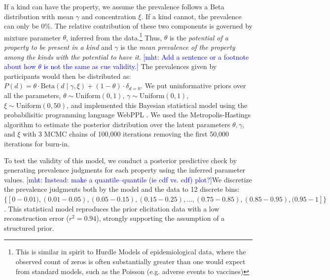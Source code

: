 \documentclass[12pt,letterpaper]{article}
\newcommand{\ndg}[1]{\textcolor{Green}{[ndg: #1]}}
\newcommand{\mht}[1]{\textcolor{Blue}{[mht: #1]}}
\begin{document}
If a kind can have the property, we assume the prevalence follows a Beta distribution with mean $\gamma$ and concentration $\xi$. 
If a kind cannot, the prevalence can only be 0\%.
The relative contribution of these two components is governed by mixture parameter $\theta$, inferred from the data.\footnote{This is similar in spirit to Hurdle Models of epidemiological data, where the observed count of zeros is often substantially greater than one would expect from standard models, such as the Poisson (e.g. adverse events to vaccines)\cite{hurdleModels}}
Thus, $\theta$ is the \emph{potential of a property to be present in a kind} and $\gamma$ is the \emph{mean prevalence of the property among the kinds with the potential to have it}. \mht{Add a sentence or a footnote about how $\theta$ is not the same as cue validity.} The prevalences given by participants would then be distributed as: $P(d) = \theta \cdot \text{Beta}(d \mid \gamma,\xi)+ (1 - \theta) \cdot \delta_{d=0} $. 
We put uninformative priors over all the parameters, $\theta \sim \text{Uniform}(0,1)$, 
$\gamma \sim \text{Uniform}(0,1)$, $\xi \sim \text{Uniform}(0, 50)$, and implemented this Bayesian statistical model using the probabilisitic programming language WebPPL \cite{dippl}. We used the Metropolis-Hastings algorithm to estimate the posterior distribution over the latent parameters $\theta, \gamma$, and $\xi$ with 3 MCMC chains of 100,000 iterations removing the first 50,000 iterations for burn-in.

To test the validity of this model, we conduct a posterior predictive check by generating prevalence judgments for each property using the inferred parameter values. 
\mht{Instead: make a quantile--quantile (ie cdf vs. cdf) plot?}We discretize the prevalence judgments both by the model and the data to  12 discrete bins: $\{[0-0.01), (0.01-0.05), (0.05-0.15), (0.15-0.25),  ..., (0.75-0.85), (0.85-0.95), (0.95-1]\}$.
This statistical model reproduces the prior elicitation data with a low reconstruction error ($r^2 = 0.94$), strongly supporting the assumption of a structured prior. 
\end{document}
